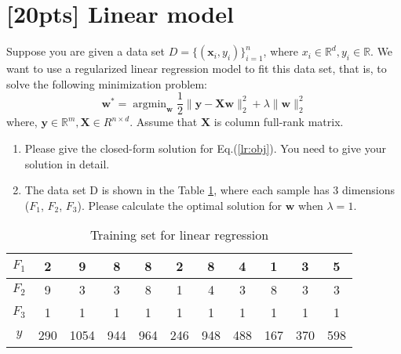 \documentclass{article}
\begin{document}
    \section{[20pts] Linear model}
    \newcommand{\w}{\mathbf{w}}
    \newcommand{\x}{\mathbf{x}}
    \newcommand{\y}{\mathbf{y}}
    \newcommand{\W}{\mathbf{W}}
    \newcommand{\X}{\mathbf{X}}
    \newcommand{\Y}{\mathbf{Y}}
    Suppose you are given a data set $D=\{(\mathbf{x}_i, y_i)\}_{i=1}^n$, where ${x}_i \in \mathbb{R}^d, y_i \in \mathbb{R}$.
    We want to use a regularized linear regression model to fit this data set, that is, to solve the following minimization problem:
    \begin{equation}
        \w^{*} = \mathop{\arg \min}_{\w} \frac{1}{2}\|\y-\X \w\|_2^2 + \lambda\|\w\|_2^2
        \label{lr:obj}
    \end{equation}
    where, $\y \in \mathbb{R}^m, \X \in R^{n\times d}$. Assume that $\X$ is column full-rank matrix.
    \begin{enumerate}
        \item Please give the closed-form solution for Eq.(\ref{lr:obj}). You need to give your solution in detail.
        \item The data set D is shown in the Table \ref{lr:trs}, where each sample has 3 dimensions ($F_1$, $F_2$, $F_3$). Please calculate the optimal solution for $\w$ when $\lambda = 1$.
    \end{enumerate}
    \begin{table}[!htb]
        \centering
        \begin{tabular}{c|c|c|c|c|c|c|c|c|c|c}
            \hline
            $F_1$ & 2 & 9 & 8 & 8 & 2 & 8 & 4 & 1 & 3 & 5\\ \hline
            $F_2$ & 9 & 3 & 3 & 8 & 1 & 4 & 3 & 8 & 3 & 3\\ \hline
            $F_3$ & 1 & 1 & 1 & 1 & 1 & 1 & 1 & 1 & 1 & 1\\ \hline
            $y$ & 290 & 1054 & 944 & 964 & 246 & 948 & 488 & 167 & 370 & 598 \\
            \hline
        \end{tabular}
        \caption{Training set for linear regression}
        \label{lr:trs}
    \end{table}
    
    \newpage
\end{document}
